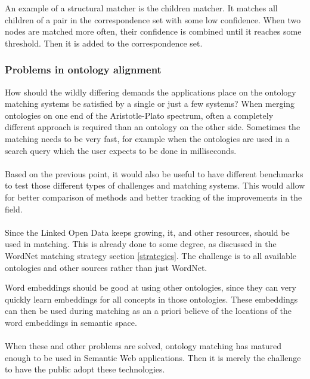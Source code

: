 \documentclass{article}
\begin{document}
 An example of a structural matcher is the children matcher. It matches all children of a pair in the correspondence set with some low confidence. When two nodes are matched more often, their confidence is combined until it reaches some threshold. Then it is added to the correspondence set.
 
 \subsubsection{Problems in ontology alignment}
 How should the wildly differing demands the applications place on the ontology matching systems be satisfied by a single or just a few systems? When merging ontologies on one end of the Aristotle-Plato spectrum, often a completely different approach is required than an ontology on the other side. Sometimes the matching needs to be very fast, for example when the ontologies are used in a search query which the user expects to be done in milliseconds.
 \paragraph{}
 Based on the previous point, it would also be useful to have different benchmarks to test those different types of challenges and matching systems. This would allow for better comparison of methods and better tracking of the improvements in the field.
 \paragraph{}
 Since the Linked Open Data keeps growing, it, and other resources, should be used in matching. This is already done to some degree, as discussed in the WordNet matching strategy section \ref{strategies}. The challenge is to all available ontologies and other sources rather than just WordNet.
 
 Word embeddings should be good at using other ontologies, since they can very quickly learn embeddings for all concepts in those ontologies. These embeddings can then be used during matching as an a priori believe of the locations of the word embeddings in semantic space.
 \paragraph{}
 When these and other problems are solved, ontology matching has matured enough to be used in Semantic Web applications. Then it is merely the challenge to have the public adopt these technologies.
 
\end{document}
